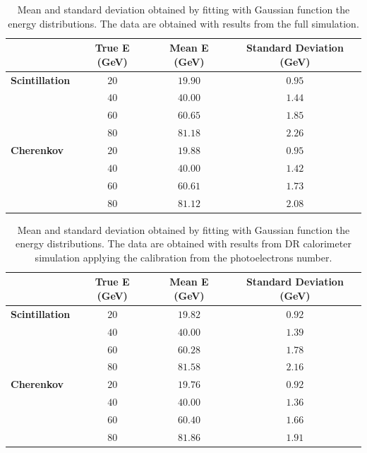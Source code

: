 \begin{table}
	\centering
	\begin{tabular}{lccc}
		\toprule
		& True E (GeV) & Mean E (GeV) & Standard Deviation (GeV) \\
		\midrule
		\textbf{Scintillation} &	$20$ 	& $19.90$ & $0.95$ \\
		& $40$ 	& $40.00$ & $1.44$ \\
		& $60$ 	& $60.65$ & $1.85$ \\
		& $80$ 	& $81.18$ & $2.26$ \\
		\midrule
		\textbf{Cherenkov} & $20$ 	& $19.88$ & $0.95$ \\
		& $40$ 	& $40.00$ & $1.42$ \\
		& $60$ 	& $60.61$ & $1.73$ \\
		& $80$ 	& $81.12$ & $2.08$ \\
		\bottomrule
	\end{tabular}
	\caption{Mean and standard deviation obtained by fitting with Gaussian function the energy distributions. The data are obtained with results from the full simulation.}
	\label{tab:e_res_int}
\end{table}

\begin{table}
	\centering
	\begin{tabular}{lccc}
		\toprule
		& True E (GeV) & Mean E (GeV) & Standard Deviation (GeV) \\
		\midrule
		\textbf{Scintillation} &	$20$ 	& $19.82$ & $0.92$ \\
		& $40$ 	& $40.00$ & $1.39$ \\
		& $60$ 	& $60.28$ & $1.78$ \\
		& $80$ 	& $81.58$ & $2.16$ \\
		\midrule
		\textbf{Cherenkov} & $20$ 	& $19.76$ & $0.92$ \\
		& $40$ 	& $40.00$ & $1.36$ \\
		& $60$ 	& $60.40$ & $1.66$ \\
		& $80$ 	& $81.86$ & $1.91$ \\
		\bottomrule
	\end{tabular}
	\caption{Mean and standard deviation obtained by fitting with Gaussian function the energy distributions. The data are obtained with results from DR calorimeter simulation applying the calibration from the photoelectrons number.}
	\label{tab:e_res_pe}
\end{table}

